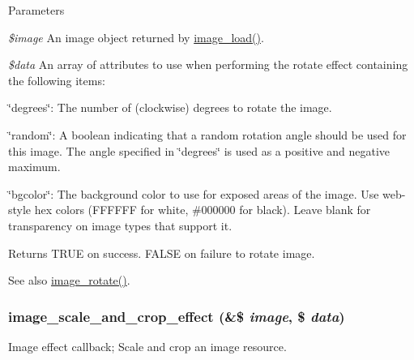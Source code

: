 \begin{DoxyParams}{Parameters}
\item[{\em \$image}]An image object returned by \hyperlink{group__image_ga96098e5b039dc3906a656fa889a04776}{image\_\-load()}. \item[{\em \$data}]An array of attributes to use when performing the rotate effect containing the following items:
\begin{DoxyItemize}
\item \char`\"{}degrees\char`\"{}: The number of (clockwise) degrees to rotate the image.
\item \char`\"{}random\char`\"{}: A boolean indicating that a random rotation angle should be used for this image. The angle specified in \char`\"{}degrees\char`\"{} is used as a positive and negative maximum.
\item \char`\"{}bgcolor\char`\"{}: The background color to use for exposed areas of the image. Use web-\/style hex colors (FFFFFF for white, \#000000 for black). Leave blank for transparency on image types that support it. 
\end{DoxyItemize}\end{DoxyParams}
\begin{DoxyReturn}{Returns}
TRUE on success. FALSE on failure to rotate image. 
\end{DoxyReturn}
\begin{DoxySeeAlso}{See also}
\hyperlink{group__image_gaccf6671cd3ed866c6463ef6ae6436dc3}{image\_\-rotate()}. 
\end{DoxySeeAlso}
\hypertarget{image_8effects_8inc_a5280c11ad64a5dc2a5e3bb30e68f1bff}{
\subsubsection[{image\_\-scale\_\-and\_\-crop\_\-effect}]{\setlength{\rightskip}{0pt plus 5cm}image\_\-scale\_\-and\_\-crop\_\-effect (\&\$ {\em image}, \/  \$ {\em data})}}
\label{image_8effects_8inc_a5280c11ad64a5dc2a5e3bb30e68f1bff}
Image effect callback; Scale and crop an image resource.


